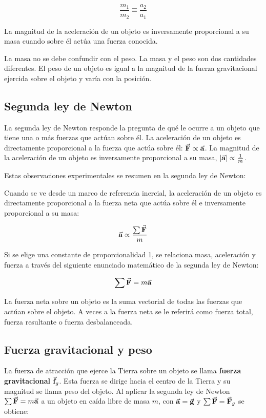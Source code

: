     \[
      \frac{m_{1}}{m_{2}} \equiv \frac{a_{2}}{a_{1}}
    \]

    \PN La magnitud de la aceleración de un objeto es inversamente proporcional a su masa cuando sobre él actúa una
    fuerza conocida.

    \PN La masa no se debe confundir con el peso. La masa y el peso son dos cantidades diferentes. El peso de un objeto
    es igual a la magnitud de la fuerza gravitacional ejercida sobre el objeto y varía con la posición.

  \subsection{Segunda ley de Newton}
    \PN La segunda ley de Newton responde la pregunta de qué le ocurre a un objeto que tiene una o más fuerzas que
    actúan sobre él. La aceleración de un objeto es directamente proporcional a la fuerza que actúa sobre él:
    $\vec{\mathbf{F}} \propto \vec{\mathbf{a}}$. La magnitud de la aceleración de un objeto es inversamente proporcional a su masa,
    $\lvert\vec{\mathbf{a}}\rvert \propto \frac{1}{m}$.

    \PN Estas observaciones experimentales se resumen en la segunda ley de Newton:

    \begin{tcolorbox}
      Cuando se ve desde un marco de referencia inercial, la aceleración de un objeto es directamente proporcional a la
      fuerza neta que actúa sobre él e inversamente proporcional a su masa:

      \[
        \vec{\mathbf{a}} \propto \frac{\sum \vec{\mathbf{F}}}{m}
      \]
    \end{tcolorbox}

    \PN Si se elige una constante de proporcionalidad 1, se relaciona masa, aceleración y fuerza a través del siguiente
    enunciado matemático de la segunda ley de Newton:

    \[
      \sum \vec{\mathbf{F}} = m \vec{\mathbf{a}}
    \]

    \PN La fuerza neta sobre un objeto es la suma vectorial de todas las fuerzas que actúan sobre el objeto. A veces a
    la fuerza neta se le referirá como fuerza total, fuerza resultante o fuerza desbalanceada.

  \subsection{Fuerza gravitacional y peso}
    \PN La fuerza de atracción que ejerce la Tierra sobre un objeto se llama \textbf{fuerza gravitacional} $\vec{\mathbf{f}}_{g}$.
    Esta fuerza se dirige hacia el centro de la Tierra y su magnitud se llama peso del objeto. Al aplicar la segunda ley
    de Newton $\sum \vec{\mathbf{F}} = m \vec{\mathbf{a}}$ a un objeto en caída libre de masa $m$, con $\vec{\mathbf{a}} = \vec{\mathbf{g}}$ y
    $\sum \vec{\mathbf{F}} = \vec{\mathbf{F}}_{g}$ se obtiene:

